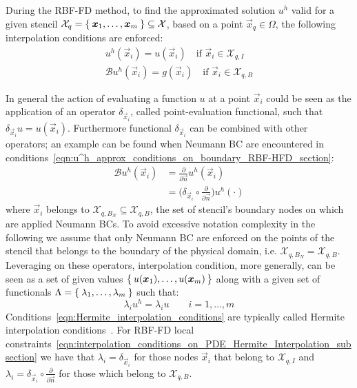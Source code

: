 During the RBF-FD method, to find the approximated solution $u^h$ valid for a given stencil $\mathcal{X}_q = \Set{\boldsymbol{x}_1, \dots, \boldsymbol{x}_m} \subseteq \mathcal{X}$, based on a point $\vec{x}_q \in \Omega$, the following interpolation conditions are enforced:
\begin{subequations}
	\label{eqn:interpolation_conditions_on_PDE_Hermite_Interpolation_subsection}
	\begin{gather}
		u^h(\vec{x}_i) = u(\vec{x}_i) \quad \text{if $\vec{x}_i \in \mathcal{X}_{q,I}$}  \label{eqn:u^h_approx_u_conditions_RBF-HFD_section} \\
		\mathcal{B} u^h(\vec{x}_i) = g(\vec{x}_i) \quad \text{if $\vec{x}_i \in \mathcal{X}_{q,B}$} \label{eqn:u^h_approx_conditions_on_boundary_RBF-HFD_section}
	\end{gather}
\end{subequations}

In general the action of evaluating a function $u$ at a point $\vec{x}_i$ could be seen as the application of an operator $\delta_{\vec{x}_i}$, called point-evaluation functional, such that $\delta_{\vec{x}_i} u = u(\vec{x}_i)$. Furthermore functional $\delta_{\vec{x}_i}$ can be combined with other operators; an example can be found when Neumann BC are encountered in conditions~\eqref{eqn:u^h_approx_conditions_on_boundary_RBF-HFD_section}:
\begin{equation}
	\begin{aligned}
		\mathcal{B} u^h(\vec{x}_i) & = \frac{\partial}{\partial \vec{n}} u^h(\vec{x}_i)											\\
								   & = \bigg( \delta_{\vec{x}_i} \circ \frac{\partial}{\partial \vec{n}} \bigg) u^h(\cdot)
	\end{aligned}
\end{equation}
where $\vec{x}_i$ belongs to $\mathcal{X}_{q,B_N} \subseteq \mathcal{X}_{q,B}$, the set of stencil's boundary nodes on which are applied Neumann BCs. To avoid excessive notation complexity in the following we assume that only Neumann BC are enforced on the points of the stencil that belongs to the boundary of the physical domain, i.e. $\mathcal{X}_{q,B_N} = \mathcal{X}_{q,B}$.
Leveraging on these operators, interpolation condition, more generally, can be seen as a set of given values $\Set{u(\boldsymbol{x}_1), \dots, u(\boldsymbol{x}_{m})}$ along with a given set of functionals $\Lambda = \Set{\lambda_1, \dots, \lambda_{m}}$ such that:
\begin{equation}
	\label{eqn:Hermite_interpolation_conditions}
	\lambda_i u^h = \lambda_i u \qquad i = 1, \dots, m
\end{equation}
Conditions~\eqref{eqn:Hermite_interpolation_conditions} are typically called Hermite interpolation conditions~\cite{Fasshauer:details_on_basic_functions}.
For RBF-FD local constraints~\eqref{eqn:interpolation_conditions_on_PDE_Hermite_Interpolation_subsection} we have that $\lambda_i = \delta_{\vec{x}_i}$ for those nodes $\vec{x}_i$ that belong to $\mathcal{X}_{q,I}$ and $\lambda_i = \delta_{\vec{x}_i} \circ \frac{\partial}{\partial \vec{n}}$ for those which belong to $\mathcal{X}_{q,B}$.

